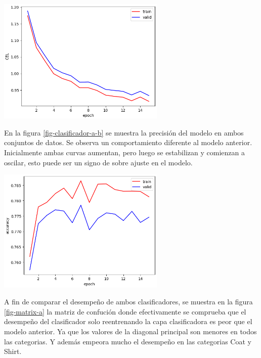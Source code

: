 \documentclass[aps,prl,reprint,groupedaddress]{revtex4-2}
\newenvironment{Figura}
  {\par\medskip\noindent\minipage{\linewidth}}
  {\endminipage\par\medskip}
\begin{document}
\begin{Figura}
  \centering
  \includegraphics[width=0.60\textwidth]{figs/modelo_original_entrenando_solo_clasificadora_a.png}
  \label{fig-clasificador-a-a}
\end{Figura}

En la figura \ref{fig-clasificador-a-b} se muestra la precisión del modelo en
ambos conjuntos de datos. Se observa un comportamiento diferente al modelo 
anterior. Inicialmente ambas curvas aumentan, pero luego se estabilizan y 
comienzan a oscilar, esto puede ser un signo de sobre ajuste en el modelo.

\begin{Figura}
  \centering
  \includegraphics[width=0.60\textwidth]{figs/modelo_original_entrenando_solo_clasificadora_b.png}
  \label{fig-clasificador-a-b}
\end{Figura}

A fin de comparar el desempeño de ambos clasificadores, se muestra en la figura
\ref{fig-matrix-a} la matriz de confución donde efectivamente se comprueba que 
el desempeño del clasificador solo reentrenando la capa clasificadora es peor
que el modelo anterior. Ya que los valores de la diagonal principal son menores
en todos las categorias. Y además empeora mucho el desempeño en las categorias 
Coat y Shirt.
\end{document}
